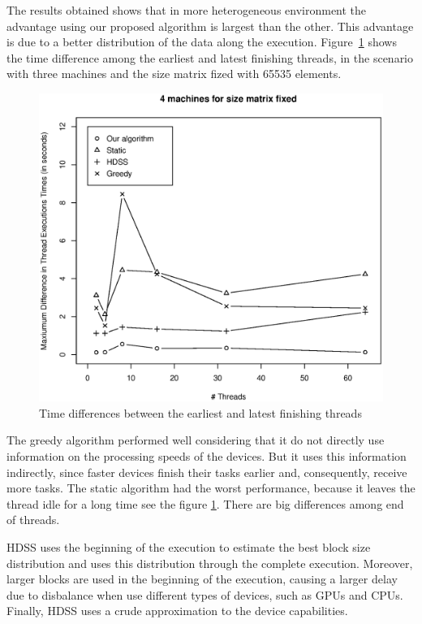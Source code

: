 \documentclass[journal]{IEEEtran}
\begin{document}
The results obtained shows that in more heterogeneous environment the advantage  using our proposed algorithm is largest than the other. This advantage is due to a better distribution of the data along the execution. Figure~\ref{fig:diferencaThreads} shows the time difference among the earliest and latest finishing threads, in the scenario with three machines and the size matrix fized with 65535 elements. 

\begin{figure}[htb]
	\begin{center}
	\centering
			\includegraphics[scale=0.4]{Maxima_Diferenca_Matrix.eps}
	\caption{Time differences between the earliest and latest finishing threads}
	\label{fig:diferencaThreads}
	\end{center}
\end{figure}


The greedy algorithm performed well considering that it do not directly
use information on the processing speeds of the devices. But it uses this
information indirectly, since faster devices finish their tasks earlier and,
consequently, receive more tasks. The static algorithm had the worst performance, because it leaves the thread idle for a long time see the figure \ref{fig:diferencaThreads}. There are big differences among end of threads.

HDSS uses the beginning of the execution to estimate the best block size
distribution and uses this distribution through the complete
execution. Moreover, larger blocks are used in the beginning of the execution,
causing a larger delay due to disbalance when use different types of devices,
such as GPUs and CPUs. Finally, HDSS uses a crude approximation to the device
capabilities.
\end{document}
